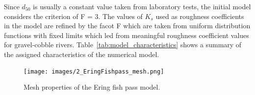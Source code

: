\documentclass[draft,linenumbers,onecolumn]{agujournal2019} %
\begin{document}
Since \(d_{50}\) is usually a constant value taken from laboratory tests, the initial model considers the criterion of F = 3. The values of \(K_{s}\) used as roughness coefficients in the model are refined by the facot F which are taken from uniform distribution functions with fixed limits which led from meaningful roughness coefficient values for gravel-cobble rivers. Table~\ref{tab:model_characteristics} shows a summary of the assigned characteristics of the numerical model.
%
%








\begin{figure}[!htbp]
	\centering
	\texttt{[image: images/2\_EringFishpass\_mesh.png]}
	\caption{Mesh properties of the Ering fish pass model.}
	\label{fig:Mesh}
\end{figure}
\end{document}
